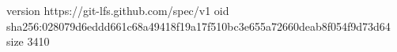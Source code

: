 version https://git-lfs.github.com/spec/v1
oid sha256:028079d6eddd661c68a49418f19a17f510bc3e655a72660deab8f054f9d73d64
size 3410
